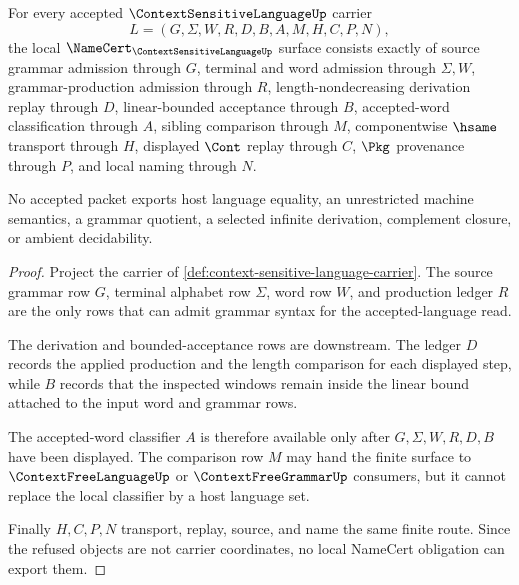 \begin{theorem}
\label{thm:context-sensitive-language-namecert-obligations}
For every accepted $\ContextSensitiveLanguageUp$ carrier
$$
L=(G,\Sigma,W,R,D,B,A,M,H,C,P,N),
$$
the local $\NameCert_{\ContextSensitiveLanguageUp}$ surface consists exactly of source grammar admission through $G$, terminal and word admission through $\Sigma,W$, grammar-production admission through $R$, length-nondecreasing derivation replay through $D$, linear-bounded acceptance through $B$, accepted-word classification through $A$, sibling comparison through $M$, componentwise $\hsame$ transport through $H$, displayed $\Cont$ replay through $C$, $\Pkg$ provenance through $P$, and local naming through $N$.

No accepted packet exports host language equality, an unrestricted machine semantics, a grammar quotient, a selected infinite derivation, complement closure, or ambient decidability.
\end{theorem}
\begin{proof}
Project the carrier of \autoref{def:context-sensitive-language-carrier}. The source grammar row $G$, terminal alphabet row $\Sigma$, word row $W$, and production ledger $R$ are the only rows that can admit grammar syntax for the accepted-language read.

The derivation and bounded-acceptance rows are downstream. The ledger $D$ records the applied production and the length comparison for each displayed step, while $B$ records that the inspected windows remain inside the linear bound attached to the input word and grammar rows.

The accepted-word classifier $A$ is therefore available only after $G,\Sigma,W,R,D,B$ have been displayed. The comparison row $M$ may hand the finite surface to $\ContextFreeLanguageUp$ or $\ContextFreeGrammarUp$ consumers, but it cannot replace the local classifier by a host language set.

Finally $H,C,P,N$ transport, replay, source, and name the same finite route. Since the refused objects are not carrier coordinates, no local NameCert obligation can export them.
\end{proof}

